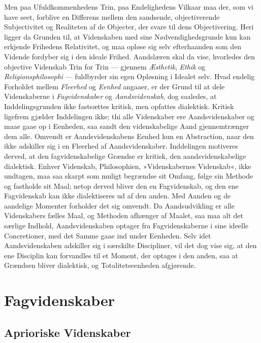 \documentclass[12pt]{book}
\newcommand{\apage}[1]{\marginnote{\footnotesize\textit{[#1]}}}
\begin{document}
Men paa Ufuldkommenhedens Trin, paa Endelighedens Vilkaar maa der, som vi
have seet, forblive en Differens mellem den sandsende, objectiverende \apage{96} 
Subjectivitet og Realiteten af de Objecter, der svare til dens
Objectivering. Heri ligger da Grunden til, at Videnskaben med sine
Nødvendighedsgrunde kun kan erkjende Frihedens Relativitet, og maa opløse
sig selv efterhaanden som den Vidende fordyber sig i den ideale Frihed.
Aandslæren skal da vise, hvorledes den objective Videnskab Trin for Trin
--- gjennem \emph{Æsthetik}, \emph{Ethik} og \emph{Religionsphilosophi} --- fuldbyrder sin egen
Opløsning i Idealet selv. Hvad endelig Forholdet mellem \emph{Fleerhed} og \emph{Eenhed}
angaaer, er der Grund til at dele Videnskaberne i \emph{Fagvidenskaber} og
\emph{Aandsvidenskab}, dog saaledes, at Inddelingsgrunden ikke fastsættes
kritisk, men opfattes dialektisk. Kritisk ligefrem gjælder Inddelingen
ikke; thi alle Videnskaber ere Aandsvidenskaber og maae gaae op i Eenheden,
saa sandt den videnskabelige Aand gjennemtrænger dem alle. Omvendt er
Aandsvidenskabens Eenhed kun en Abstraction, naar den ikke adskiller sig i
en Fleerhed af Aandsvidenskaber. Inddelingen motiveres derved, at den
fagvidenskabelige Grændse er kritisk, den aandsvidenskabelige dialektisk.
Enhver Videnskab, Philosophien, »Videnskabernes Videnskab«, ikke undtagen,
maa saa skarpt som muligt begrændse sit Omfang, følge sin Methode og
fastholde sit Maal; netop derved bliver den en Fagvidenskab, og den ene
Fagvidenskab kan ikke dialektiseres ud af den anden. Med Aanden og de
aandelige Momenter forholder det sig omvendt. Da Aandsudvikling er alle
Videnskabers fælles Maal, og Methoden afhænger af Maalet, saa maa alt det
\apage{97} særlige Indhold, Aandsvidenskaben optager fra Fagvidenskaberne i sine
ideelle Concretioner, med det Samme gaae ind under Eenheden. Selv idet
Aandsvidenskaben adskiller sig i særskilte Discipliner, vil det dog vise
sig, at den ene Disciplin kan forvandles til et Moment, der optages i den
anden, saa at Grændsen bliver dialektisk, og Totalitetseenheden afgjørende.


 \apage{98} 
\part{Fagvidenskaber}

\chapter{Aprioriske Videnskaber}
\end{document}

